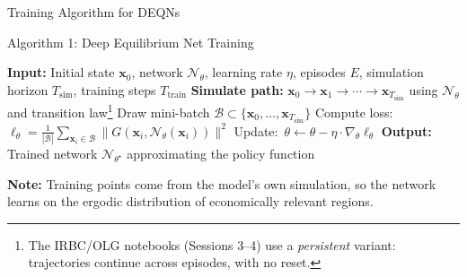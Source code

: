 \documentclass[aspectratio=169,11pt]{beamer}
\newcommand{\emphc}[1]{\textcolor{harvardcrimson}{#1}}
\newcommand{\x}{\bm{x}}
\begin{document}
\begin{frame}{Training Algorithm for DEQNs}
\begin{block}{Algorithm 1: Deep Equilibrium Net Training}
\begin{algorithmic}
\scriptsize
\STATE \textbf{Input:} Initial state $\x_0$, network $\mathcal{N}_\theta$, learning rate $\eta$, episodes $E$, simulation horizon $T_{\mathrm{sim}}$, training steps $T_{\mathrm{train}}$
    \STATE \textbf{Simulate path:} $\x_0 \to \x_1 \to \cdots \to \x_{T_{\mathrm{sim}}}$ using $\mathcal{N}_\theta$ and transition law\footnote{The IRBC/OLG notebooks (Sessions 3--4) use a \emph{persistent} variant: trajectories continue across episodes, with no reset.}
        \STATE Draw mini-batch $\mathcal{B} \subset \{\x_0, \ldots, \x_{T_{\mathrm{sim}}}\}$
        \STATE Compute loss:~$\ell_\theta = \frac{1}{|\mathcal{B}|}\sum_{\x_i \in \mathcal{B}} \|G(\x_i, \mathcal{N}_\theta(\x_i))\|^2$
        \STATE Update:~$\theta \leftarrow \theta - \eta \cdot \nabla_\theta \ell_\theta$
    \ENDFOR
\ENDFOR
\STATE \textbf{Output:} Trained network $\mathcal{N}_{\theta^\star}$ approximating the policy function
\end{algorithmic}
\end{block}

\vspace{0.2em}
{\small \textbf{Note:} Training points come from the \emphc{model's own simulation}, so the network learns on the ergodic distribution of economically relevant regions.}
\end{frame}
\end{document}
